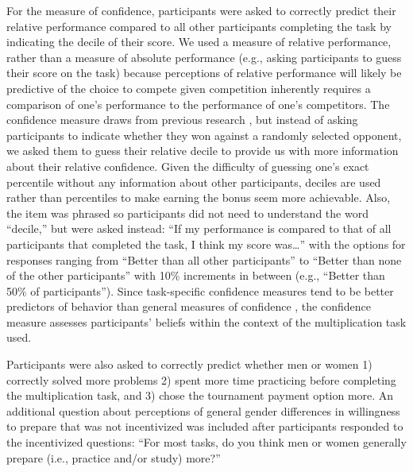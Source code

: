 \documentclass[a4paper, nobind]{templates/ociamthesis}
\begin{document}
For the measure of confidence, participants were asked to correctly predict their relative performance compared to all other participants completing the task by indicating the decile of their score. We used a measure of relative performance, rather than a measure of absolute performance (e.g., asking participants to guess their score on the task) because perceptions of relative performance will likely be predictive of the choice to compete given competition inherently requires a comparison of one's performance to the performance of one's competitors. The confidence measure draws from previous research \autocite{Niederle2007}, but instead of asking participants to indicate whether they won against a randomly selected opponent, we asked them to guess their relative decile to provide us with more information about their relative confidence. Given the difficulty of guessing one's exact percentile without any information about other participants, deciles are used rather than percentiles to make earning the bonus seem more achievable. Also, the item was phrased so participants did not need to understand the word ``decile,'' but were asked instead: ``If my performance is compared to that of all participants that completed the task, I think my score was\ldots{}'' with the options for responses ranging from ``Better than all other participants'' to ``Better than none of the other participants'' with 10\% increments in between (e.g., ``Better than 50\% of participants''). Since task-specific confidence measures tend to be better predictors of behavior than general measures of confidence \autocite[see][ for review]{Oney2015}, the confidence measure assesses participants' beliefs within the context of the multiplication task used.

Participants were also asked to correctly predict whether men or women 1) correctly solved more problems 2) spent more time practicing before completing the multiplication task, and 3) chose the tournament payment option more. An additional question about perceptions of general gender differences in willingness to prepare that was not incentivized was included after participants responded to the incentivized questions: ``For most tasks, do you think men or women generally prepare (i.e., practice and/or study) more?''
\end{document}
